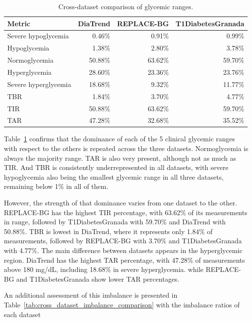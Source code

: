\begin{table}[htbp]
    \centering
    \caption{Cross-dataset comparison of glycemic ranges.}
    \label{tab:cross_dataset_glycemic_comparison}
    \begin{tabular}{lrrr}
        \hline
        \textbf{Metric} & \textbf{DiaTrend} & \textbf{REPLACE-BG} & \textbf{T1DiabetesGranada} \\
        \hline
        Severe hypoglycemia & 0.46\% & 0.91\% & 0.99\% \\
        Hypoglycemia & 1.38\% & 2.80\% & 3.78\% \\
        Normoglycemia & 50.88\% & 63.62\% & 59.70\% \\
        Hyperglycemia & 28.60\% & 23.36\% & 23.76\% \\
        Severe hyperglycemia & 18.68\% & 9.32\% & 11.77\% \\
        \hline
        TBR & 1.84\% & 3.70\% & 4.77\% \\
        TIR & 50.88\% & 63.62\% & 59.70\% \\
        TAR & 47.28\% & 32.68\% & 35.52\% \\
        \hline
    \end{tabular}
\end{table}

Table~\ref{tab:cross_dataset_glycemic_comparison} confirms that the dominance of each of the 5 clinical glycemic ranges with respect to the others is repeated across the three datasets. Normoglycemia is always the majority range. TAR is also very present, although not as much as TIR. And TBR is consistently underrepresented in all datasets, with severe hypoglycemia also being the smallest glycemic range in all three datasets, remaining below 1\% in all of them.

However, the strength of that dominance varies from one dataset to the other. REPLACE-BG has the highest TIR percentage, with 63.62\% of its measurements in range, followed by T1DiabetesGranada with 59.70\% and DiaTrend with 50.88\%. TBR is lowest in DiaTrend, where it represents only 1.84\% of measurements, followed by REPLACE-BG with 3.70\% and T1DiabetesGranada with 4.77\%. The main difference between datasets appears in the hyperglycemic region. DiaTrend has the highest TAR percentage, with 47.28\% of measurements above 180 mg/dL, including 18.68\% in severe hyperglycemia. while REPLACE-BG and T1DiabetesGranada show lower TAR percentages.

An additional assessment of this imbalance is presented in Table~\ref{tab:cross_dataset_imbalance_comparison} with the imbalance ratios of each dataset

